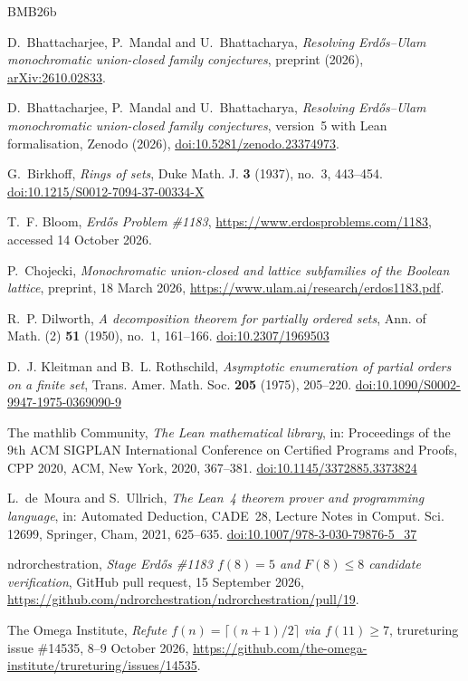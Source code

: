\documentclass[11pt,reqno]{amsart}
\numberwithin{equation}{section}
\theoremstyle{plain}
\theoremstyle{definition}
\theoremstyle{remark}
\begin{document}
\begin{thebibliography}{BMB26b}
\raggedright

D.~Bhattacharjee, P.~Mandal and U.~Bhattacharya,
\emph{Resolving Erd\H{o}s--Ulam monochromatic union-closed family
conjectures}, preprint (2026),
\href{https://arxiv.org/abs/2610.02833}{arXiv:2610.02833}.

D.~Bhattacharjee, P.~Mandal and U.~Bhattacharya,
\emph{Resolving Erd\H{o}s--Ulam monochromatic union-closed family
conjectures}, version~5 with Lean formalisation, Zenodo (2026),
\href{https://doi.org/10.5281/zenodo.23374973}{doi:10.5281/zenodo.23374973}.

G.~Birkhoff,
\emph{Rings of sets},
Duke Math. J. \textbf{3} (1937), no.~3, 443--454.
\href{https://doi.org/10.1215/S0012-7094-37-00334-X}{doi:10.1215/S0012-7094-37-00334-X}

T.~F. Bloom,
\emph{Erd\H{o}s Problem \#1183},
\url{https://www.erdosproblems.com/1183}, accessed 14 October 2026.

P.~Chojecki,
\emph{Monochromatic union-closed and lattice subfamilies of the Boolean
lattice}, preprint, 18 March 2026,
\url{https://www.ulam.ai/research/erdos1183.pdf}.

R.~P. Dilworth,
\emph{A decomposition theorem for partially ordered sets},
Ann. of Math. (2) \textbf{51} (1950), no.~1, 161--166.
\href{https://doi.org/10.2307/1969503}{doi:10.2307/1969503}

D.~J. Kleitman and B.~L. Rothschild,
\emph{Asymptotic enumeration of partial orders on a finite set},
Trans. Amer. Math. Soc. \textbf{205} (1975), 205--220.
\href{https://doi.org/10.1090/S0002-9947-1975-0369090-9}{doi:10.1090/S0002-9947-1975-0369090-9}

The mathlib Community,
\emph{The Lean mathematical library},
in: Proceedings of the 9th ACM SIGPLAN International Conference on
Certified Programs and Proofs, CPP 2020, ACM, New York, 2020, 367--381.
\href{https://doi.org/10.1145/3372885.3373824}{doi:10.1145/3372885.3373824}

L.~de~Moura and S.~Ullrich,
\emph{The Lean~4 theorem prover and programming language},
in: Automated Deduction, CADE~28,
Lecture Notes in Comput. Sci. 12699, Springer, Cham, 2021, 625--635.
\href{https://doi.org/10.1007/978-3-030-79876-5_37}{doi:10.1007/978-3-030-79876-5\_37}

ndrorchestration,
\emph{Stage Erd\H{o}s \#1183 $f(8)=5$ and $F(8)\le8$ candidate
verification}, GitHub pull request, 15 September 2026,
\url{https://github.com/ndrorchestration/ndrorchestration/pull/19}.

The Omega Institute,
\emph{Refute $f(n)=\lceil(n+1)/2\rceil$ via $f(11)\ge7$}, trureturing
issue \#14535, 8--9 October 2026,
\url{https://github.com/the-omega-institute/trureturing/issues/14535}.

\end{thebibliography}
\end{document}
